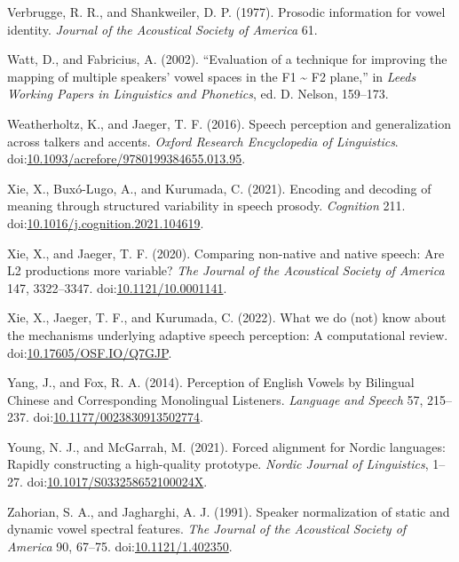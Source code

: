 \documentclass[utf8]{frontiersSCNS}
\newlength{\cslhangindent}
\newlength{\cslentryspacingunit} %
\newenvironment{CSLReferences}[2] %
 {%
  \setlength{\parindent}{0pt}
  \ifodd #1
  \let\oldpar\par
  \def\par{\hangindent=\cslhangindent\oldpar}
  \fi
  \setlength{\parskip}{#2\cslentryspacingunit}
 }%
 {}
\begin{document}
\begin{CSLReferences}{1}{0}
\leavevmode{}%
Verbrugge, R. R., and Shankweiler, D. P. (1977). Prosodic information for vowel identity. \emph{Journal of the Acoustical Society of America} 61.

\leavevmode{}%
Watt, D., and Fabricius, A. (2002). {``Evaluation of a technique for improving the mapping of multiple speakers' vowel spaces in the {F1} \textasciitilde{} {F2} plane,''} in \emph{Leeds {Working Papers} in {Linguistics} and {Phonetics}}, ed. D. Nelson, 159--173.

\leavevmode{}%
Weatherholtz, K., and Jaeger, T. F. (2016). Speech perception and generalization across talkers and accents. \emph{Oxford Research Encyclopedia of Linguistics}. doi:\href{https://doi.org/10.1093/acrefore/9780199384655.013.95}{10.1093/acrefore/9780199384655.013.95}.

\leavevmode{}%
Xie, X., Buxó-Lugo, A., and Kurumada, C. (2021). Encoding and decoding of meaning through structured variability in speech prosody. \emph{Cognition} 211. doi:\href{https://doi.org/10.1016/j.cognition.2021.104619}{10.1016/j.cognition.2021.104619}.

\leavevmode{}%
Xie, X., and Jaeger, T. F. (2020). Comparing non-native and native speech: {Are L2} productions more variable? \emph{The Journal of the Acoustical Society of America} 147, 3322--3347. doi:\href{https://doi.org/10.1121/10.0001141}{10.1121/10.0001141}.

\leavevmode{}%
Xie, X., Jaeger, T. F., and Kurumada, C. (2022). What we do (not) know about the mechanisms underlying adaptive speech perception: {A} computational review. doi:\href{https://doi.org/10.17605/OSF.IO/Q7GJP}{10.17605/OSF.IO/Q7GJP}.

\leavevmode{}%
Yang, J., and Fox, R. A. (2014). Perception of {English Vowels} by {Bilingual Chinese} and {Corresponding Monolingual Listeners}. \emph{Language and Speech} 57, 215--237. doi:\href{https://doi.org/10.1177/0023830913502774}{10.1177/0023830913502774}.

\leavevmode{}%
Young, N. J., and McGarrah, M. (2021). Forced alignment for {Nordic} languages: {Rapidly} constructing a high-quality prototype. \emph{Nordic Journal of Linguistics}, 1--27. doi:\href{https://doi.org/10.1017/S033258652100024X}{10.1017/S033258652100024X}.

\leavevmode{}%
Zahorian, S. A., and Jagharghi, A. J. (1991). Speaker normalization of static and dynamic vowel spectral features. \emph{The Journal of the Acoustical Society of America} 90, 67--75. doi:\href{https://doi.org/10.1121/1.402350}{10.1121/1.402350}.

\end{CSLReferences}
\end{document}
